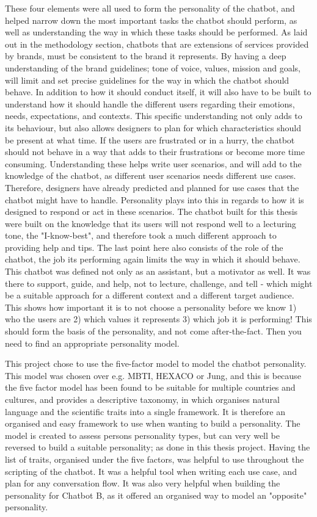 These four elements were all used to form the personality of the chatbot, and helped narrow down the most important tasks the chatbot should perform, as well as understanding the way in which these tasks should be performed. As laid out in the methodology section, chatbots that are extensions of services provided by brands, must be consistent to the brand it represents. By having a deep understanding of the brand guidelines; tone of voice, values, mission and goals, will limit and set precise guidelines for the way in which the chatbot should behave. In addition to how it should conduct itself, it will also have to be built to understand how it should handle the different users regarding their emotions, needs, expectations, and contexts. This specific understanding not only adds to its behaviour, but also allows designers to plan for which characteristics should be present at what time. If the users are frustrated or in a hurry, the chatbot should not behave in a way that adds to their frustrations or become more time consuming. Understanding these helps write user scenarios, and will add to the knowledge of the chatbot, as different user scenarios needs different use cases. Therefore, designers have already predicted and planned for use cases that the chatbot might have to handle. Personality plays into this in regards to how it is designed to respond or act in these scenarios. The chatbot built for this thesis were built on the knowledge that its users will not respond well to a lecturing tone, the "I-know-best", and therefore took a much different approach to providing help and tips. The last point here also consists of the role of the chatbot, the job its performing again limits the way in which it should behave. This chatbot was defined not only as an assistant, but a motivator as well. It was there to support, guide, and help, not to lecture, challenge, and tell - which might be a suitable approach for a different context and a different target audience. This shows how important it is to not choose a personality before we know 1) who the users are 2) which values it represents 3) which job it is performing! This should form the basis of the personality, and not come after-the-fact. Then you need to find an appropriate personality model. 

This project chose to use the five-factor model to model the chatbot personality. This model was chosen over e.g. MBTI, HEXACO or Jung, and this is because the five factor model has been found to be suitable for multiple countries and cultures, and provides a descriptive taxonomy, in which organises natural language and the scientific traits into a single framework. It is therefore an organised and easy framework to use when wanting to build a personality. The model is created to assess persons personality types, but can very well be reversed to build a suitable personality; as done in this thesis project. Having the list of traits, organised under the five factors, was helpful to use throughout the scripting of the chatbot. It was a helpful tool when writing each use case, and plan for any conversation flow. It was also very helpful when building the personality for Chatbot B, as it offered an organised way to model an "opposite" personality.

